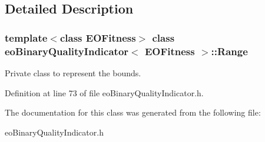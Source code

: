 \subsection{Detailed Description}
\subsubsection*{template$<$class EOFitness$>$ class eo\-Binary\-Quality\-Indicator$<$ EOFitness $>$::Range}

Private class to represent the bounds. 



Definition at line 73 of file eo\-Binary\-Quality\-Indicator.h.

The documentation for this class was generated from the following file:\begin{CompactItemize}
\item 
eo\-Binary\-Quality\-Indicator.h\end{CompactItemize}

